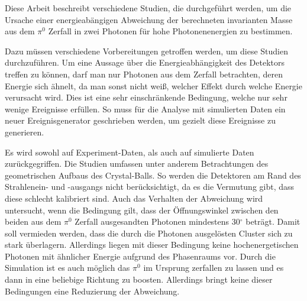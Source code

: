\documentclass[a4paper,11pt,oneside,final,german,openbib,pdftex]{scrbook}
\begin{document}
{Diese Arbeit beschreibt verschiedene Studien, die durchgef\"uhrt werden, um die Ursache einer energieab\"angigen Abweichung der berechneten invarianten Masse aus dem $\pi^0$ Zerfall in zwei Photonen f\"ur hohe Photonenenergien zu bestimmen. 

Dazu m\"ussen verschiedene Vorbereitungen getroffen werden, um diese Studien durchzuf\"uhren. Um eine Aussage \"uber die Energieabh\"angigkeit des Detektors treffen zu k\"onnen, darf man nur Photonen aus dem Zerfall betrachten, deren Energie sich \"ahnelt, da man sonst nicht wei{\ss}, welcher Effekt durch welche Energie verursacht wird. Dies ist eine sehr einschränkende Bedingung, welche nur sehr wenige Ereignisse erf\"ullen. So muss f\"ur die Analyse mit simulierten Daten ein neuer Ereignisgenerator geschrieben werden, um gezielt diese Ereignisse zu generieren.


 
 Es wird sowohl auf Experiment-Daten, als auch auf simulierte Daten zur\"uckgegriffen. Die Studien umfassen unter anderem Betrachtungen des geometrischen Aufbaus des Crystal-Balls. So werden die Detektoren am Rand des Strahlenein- und -ausgangs nicht ber\"ucksichtigt, da es die Vermutung gibt, dass diese schlecht kalibriert sind. Auch das Verhalten der Abweichung wird untersucht, wenn die Bedingung gilt, dass der \"Offnungswinkel zwischen den beiden aus dem $\pi^0$ Zerfall ausgesandten Photonen mindestens 30$^{\circ}$ betr\"agt. Damit soll vermieden werden, dass die durch die Photonen ausgel\"osten Cluster sich zu stark \"uberlagern. Allerdings liegen mit dieser Bedingung keine hochenergetischen Photonen mit \"ahnlicher Energie aufgrund des Phasenraums vor. Durch die Simulation ist es auch m\"oglich das $\pi^0$ im Ursprung zerfallen zu lassen und es dann in eine beliebige Richtung zu boosten. Allerdings bringt keine dieser Bedingungen eine Reduzierung der Abweichung.


}
\end{document}
